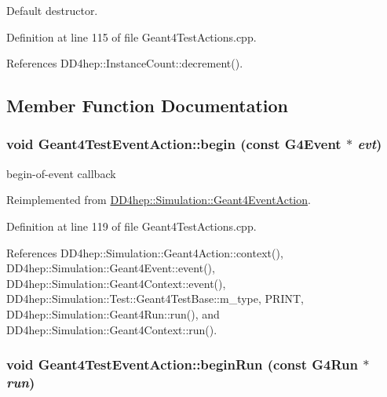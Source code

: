 Default destructor. 

Definition at line 115 of file Geant4TestActions.cpp.

References DD4hep::InstanceCount::decrement().

\subsection{Member Function Documentation}
\hypertarget{class_d_d4hep_1_1_simulation_1_1_test_1_1_geant4_test_event_action_a9bce3a0885c7d2d5c6b03756ea3c4e23}{
\subsubsection[{begin}]{\setlength{\rightskip}{0pt plus 5cm}void Geant4TestEventAction::begin (const G4Event $\ast$ {\em evt})}}
\label{class_d_d4hep_1_1_simulation_1_1_test_1_1_geant4_test_event_action_a9bce3a0885c7d2d5c6b03756ea3c4e23}


begin-\/of-\/event callback 

Reimplemented from \hyperlink{class_d_d4hep_1_1_simulation_1_1_geant4_event_action_ad10785d157fa962f4ef2a5361bb0f5da}{DD4hep::Simulation::Geant4EventAction}.

Definition at line 119 of file Geant4TestActions.cpp.

References DD4hep::Simulation::Geant4Action::context(), DD4hep::Simulation::Geant4Event::event(), DD4hep::Simulation::Geant4Context::event(), DD4hep::Simulation::Test::Geant4TestBase::m\_\-type, PRINT, DD4hep::Simulation::Geant4Run::run(), and DD4hep::Simulation::Geant4Context::run().\hypertarget{class_d_d4hep_1_1_simulation_1_1_test_1_1_geant4_test_event_action_ab8bf5d68032c1a27015c9396eb713c5f}{
\subsubsection[{beginRun}]{\setlength{\rightskip}{0pt plus 5cm}void Geant4TestEventAction::beginRun (const G4Run $\ast$ {\em run})}}
\label{class_d_d4hep_1_1_simulation_1_1_test_1_1_geant4_test_event_action_ab8bf5d68032c1a27015c9396eb713c5f}


